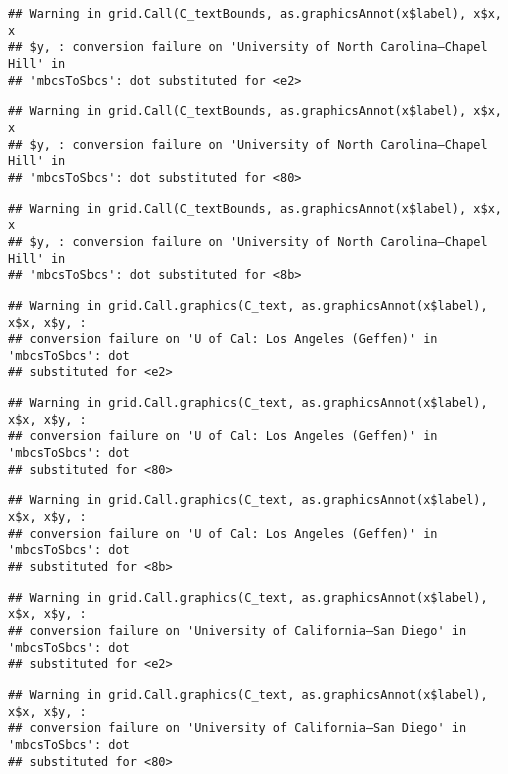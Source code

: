 \documentclass[]{article}
\begin{document}
\begin{verbatim}
## Warning in grid.Call(C_textBounds, as.graphicsAnnot(x$label), x$x, x
## $y, : conversion failure on 'University of North Carolina—​Chapel Hill' in
## 'mbcsToSbcs': dot substituted for <e2>
\end{verbatim}

\begin{verbatim}
## Warning in grid.Call(C_textBounds, as.graphicsAnnot(x$label), x$x, x
## $y, : conversion failure on 'University of North Carolina—​Chapel Hill' in
## 'mbcsToSbcs': dot substituted for <80>
\end{verbatim}

\begin{verbatim}
## Warning in grid.Call(C_textBounds, as.graphicsAnnot(x$label), x$x, x
## $y, : conversion failure on 'University of North Carolina—​Chapel Hill' in
## 'mbcsToSbcs': dot substituted for <8b>
\end{verbatim}

\begin{verbatim}
## Warning in grid.Call.graphics(C_text, as.graphicsAnnot(x$label), x$x, x$y, :
## conversion failure on 'U of Cal: ​Los Angeles (Geffen)' in 'mbcsToSbcs': dot
## substituted for <e2>
\end{verbatim}

\begin{verbatim}
## Warning in grid.Call.graphics(C_text, as.graphicsAnnot(x$label), x$x, x$y, :
## conversion failure on 'U of Cal: ​Los Angeles (Geffen)' in 'mbcsToSbcs': dot
## substituted for <80>
\end{verbatim}

\begin{verbatim}
## Warning in grid.Call.graphics(C_text, as.graphicsAnnot(x$label), x$x, x$y, :
## conversion failure on 'U of Cal: ​Los Angeles (Geffen)' in 'mbcsToSbcs': dot
## substituted for <8b>
\end{verbatim}

\begin{verbatim}
## Warning in grid.Call.graphics(C_text, as.graphicsAnnot(x$label), x$x, x$y, :
## conversion failure on 'University of California—​San Diego' in 'mbcsToSbcs': dot
## substituted for <e2>
\end{verbatim}

\begin{verbatim}
## Warning in grid.Call.graphics(C_text, as.graphicsAnnot(x$label), x$x, x$y, :
## conversion failure on 'University of California—​San Diego' in 'mbcsToSbcs': dot
## substituted for <80>
\end{verbatim}
\end{document}
